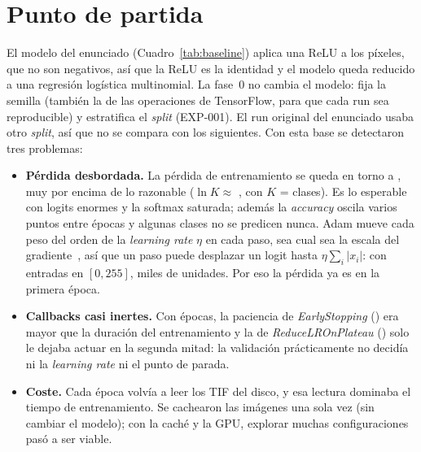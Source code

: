 \section{Punto de partida}
El modelo del enunciado (Cuadro~\ref{tab:baseline}) aplica una ReLU a los píxeles, que no son negativos, así que
la ReLU es la identidad y el modelo queda reducido a una regresión logística multinomial. La fase~0 no cambia el
modelo: fija la semilla (también la de las operaciones de TensorFlow, para que cada run sea reproducible) y estratifica
el \emph{split} (EXP-001). El run original del enunciado usaba otro \emph{split}, así que no se compara con los
siguientes. Con esta base se detectaron tres problemas:
\begin{itemize}
  \item \textbf{Pérdida desbordada.} La pérdida de entrenamiento se queda en torno a , muy
  por encima de lo razonable ($\ln K \approx$ , con $K$ =  clases). Es lo esperable con
  logits enormes y la softmax saturada; además la \emph{accuracy} oscila varios puntos entre épocas y algunas clases
  no se predicen nunca. Adam mueve cada peso del orden de la \emph{learning rate} $\eta$ en cada paso, sea cual sea la
  escala del gradiente~\cite{kingma}, así que un paso puede desplazar un logit hasta $\eta \sum_i |x_i|$: con
   entradas en $[0, 255]$, miles de unidades. Por eso la pérdida ya es 
  en la primera época.
  \item \textbf{Callbacks casi inertes.} Con  épocas, la paciencia de \emph{EarlyStopping}
  () era mayor que la duración del entrenamiento y la de \emph{ReduceLROnPlateau}
  () solo le dejaba actuar en la segunda mitad: la validación prácticamente no decidía ni la
  \emph{learning rate} ni el punto de parada.
  \item \textbf{Coste.} Cada época volvía a leer los TIF del disco, y esa lectura dominaba el tiempo de
  entrenamiento. Se cachearon las imágenes una sola vez (sin cambiar el modelo); con la caché y la GPU, explorar
  muchas configuraciones pasó a ser viable.
\end{itemize}

\begin{table}[h]
  \centering
  \caption{Modelo de partida y sus métricas de validación (EXP-001).}
  \label{tab:baseline}
\end{table}